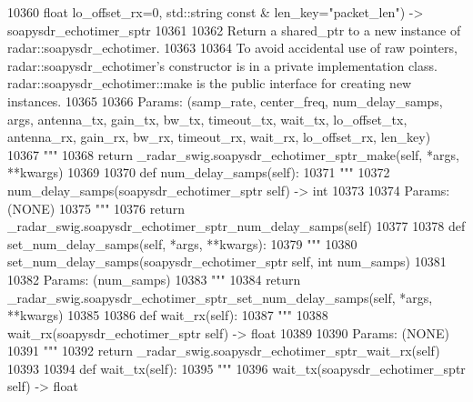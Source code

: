 \begin{DoxyCode}
{{{{{{{{{{{{{{{{{{{{{{{{{{{{{{{{{10360 \textcolor{stringliteral}{            float lo\_offset\_rx=0, std::string const & len\_key="packet\_len") -> soapysdr\_echotimer\_sptr}
10361 \textcolor{stringliteral}{}
10362 \textcolor{stringliteral}{        Return a shared\_ptr to a new instance of radar::soapysdr\_echotimer.}
10363 \textcolor{stringliteral}{}
10364 \textcolor{stringliteral}{        To avoid accidental use of raw pointers, radar::soapysdr\_echotimer's constructor is in a private
       implementation class. radar::soapysdr\_echotimer::make is the public interface for creating new instances.}
10365 \textcolor{stringliteral}{}
10366 \textcolor{stringliteral}{        Params: (samp\_rate, center\_freq, num\_delay\_samps, args, antenna\_tx, gain\_tx, bw\_tx, timeout\_tx,
       wait\_tx, lo\_offset\_tx, antenna\_rx, gain\_rx, bw\_rx, timeout\_rx, wait\_rx, lo\_offset\_rx, len\_key)}
10367 \textcolor{stringliteral}{        """}
10368         \textcolor{keywordflow}{return} \_radar\_swig.soapysdr\_echotimer\_sptr\_make(self, *args, **kwargs)
10369 
10370     \textcolor{keyword}{def }num_delay_samps(self):
10371         \textcolor{stringliteral}{"""}
10372 \textcolor{stringliteral}{        num\_delay\_samps(soapysdr\_echotimer\_sptr self) -> int}
10373 \textcolor{stringliteral}{}
10374 \textcolor{stringliteral}{        Params: (NONE)}
10375 \textcolor{stringliteral}{        """}
10376         \textcolor{keywordflow}{return} \_radar\_swig.soapysdr\_echotimer\_sptr\_num\_delay\_samps(self)
10377 
10378     \textcolor{keyword}{def }set_num_delay_samps(self, *args, **kwargs):
10379         \textcolor{stringliteral}{"""}
10380 \textcolor{stringliteral}{        set\_num\_delay\_samps(soapysdr\_echotimer\_sptr self, int num\_samps)}
10381 \textcolor{stringliteral}{}
10382 \textcolor{stringliteral}{        Params: (num\_samps)}
10383 \textcolor{stringliteral}{        """}
10384         \textcolor{keywordflow}{return} \_radar\_swig.soapysdr\_echotimer\_sptr\_set\_num\_delay\_samps(self, *args, **kwargs)
10385 
10386     \textcolor{keyword}{def }wait_rx(self):
10387         \textcolor{stringliteral}{"""}
10388 \textcolor{stringliteral}{        wait\_rx(soapysdr\_echotimer\_sptr self) -> float}
10389 \textcolor{stringliteral}{}
10390 \textcolor{stringliteral}{        Params: (NONE)}
10391 \textcolor{stringliteral}{        """}
10392         \textcolor{keywordflow}{return} \_radar\_swig.soapysdr\_echotimer\_sptr\_wait\_rx(self)
10393 
10394     \textcolor{keyword}{def }wait_tx(self):
10395         \textcolor{stringliteral}{"""}
10396 \textcolor{stringliteral}{        wait\_tx(soapysdr\_echotimer\_sptr self) -> float}
}}}}}}}}}}}}}}}}}}}}}}}}}}}}}}}}}
\end{DoxyCode}
